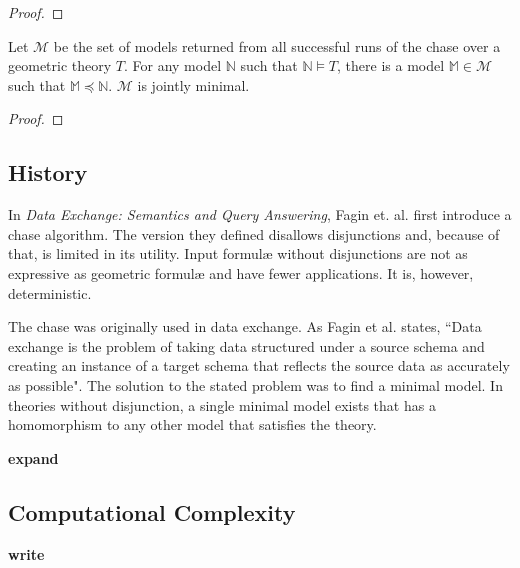 		\begin{proof}
			
		\end{proof}

		\begin{theorem}
			Let $\mathcal{M}$ be the set of models returned from all successful
			runs of the chase over a geometric theory $T$. For any model
			$\mathbb{N}$ such that $\mathbb{N} \models T$, there is a model
			$\mathbb{M} \in \mathcal{M}$ such that $\mathbb{M} \preceq
			\mathbb{N}$. $\mathcal{M}$ is jointly minimal.
		\end{theorem}

		\begin{proof}
			
		\end{proof}

	\subsection{History}

		In \cite{FKMP02} \emph{Data Exchange: Semantics and Query Answering},
		Fagin et. al. first introduce a chase algorithm. The version they
		defined disallows disjunctions and, because of that, is limited in its
		utility. Input formul{\ae} without disjunctions are not as expressive
		as geometric formul{\ae} and have fewer applications. It is, however,
		deterministic.

		The chase was originally used in data exchange. As Fagin et al. states,
		``Data exchange is the problem of taking data structured under a source
		schema and creating an instance of a target schema that reflects the
		source data as accurately as possible". The solution to the stated
		problem was to find a minimal model. In theories without disjunction, a
		single minimal model exists that has a homomorphism to any other model
		that satisfies the theory.

		\textbf{ expand }

	\subsection{Computational Complexity}

		\textbf{ write }
